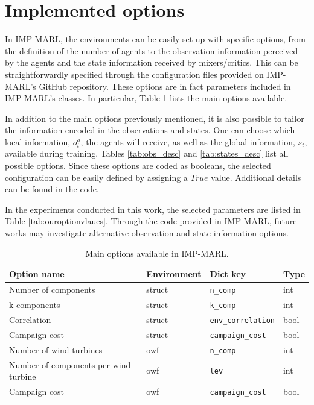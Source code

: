 \section{Implemented options}
\label{sec:ch5_appendix_options}
In IMP-MARL, the environments can be easily set up with specific options, from the definition of the number of agents to the observation information perceived by the agents and the state information received by mixers/critics. This can be straightforwardly specified through the configuration files provided on IMP-MARL's GitHub repository.
These options are in fact parameters included in IMP-MARL's classes.
In particular, Table \ref{tab:optionsEnv} lists the main options available.

In addition to the main options previously mentioned, it is also possible to tailor the information encoded in the observations and states.
One can choose which local information, $o^a_t$, the agents will receive, as well as the global information, $s_t$, available during training. 
Tables \ref{tab:obs_desc} and \ref{tab:states_desc} list all possible options.
Since these options are coded as booleans, the selected configuration can be easily defined by assigning a $True$ value.
Additional details can be found in the code.

In the experiments conducted in this work, the selected parameters are listed in Table \ref{tab:ouroptionvlaues}. Through the code provided in IMP-MARL, future works may investigate alternative observation and state information options.

\begin{table}
\centering
\caption{Main options available in IMP-MARL.}
\label{tab:optionsEnv}
\setlength\tabcolsep{4.5pt}
\begin{tabular}{llll}
\toprule
Option name & Environment & Dict key & Type   \\
\midrule
Number of components & struct & \texttt{n\_comp} & int   \\ 
k components & struct & \texttt{k\_comp} & int     \\
Correlation & struct & \texttt{env\_correlation} & bool    \\ 
Campaign cost & struct & \texttt{campaign\_cost} & bool     \\
\hline 
Number of wind turbines & owf & \texttt{n\_comp} & int   \\ 
Number of components per wind turbine & owf & \texttt{lev} & int    \\
Campaign cost & owf & \texttt{campaign\_cost} & bool \\
\bottomrule
\end{tabular}
\end{table}

